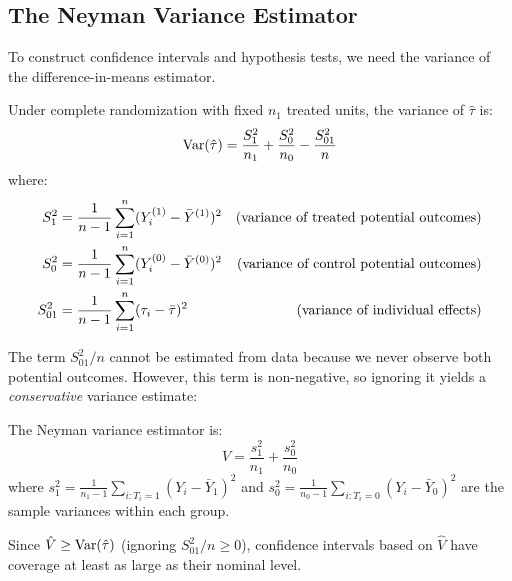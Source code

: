 \subsection{The Neyman Variance Estimator}

To construct confidence intervals and hypothesis tests, we need the variance of the difference-in-means estimator.

\begin{theorem}
\label{thm:neyman_var}
Under complete randomization with fixed $n_1$ treated units, the variance of $\hat{\tau}$ is:
\begin{equation}
\mathrm{Var}(\hat{\tau}) = \frac{S_1^2}{n_1} + \frac{S_0^2}{n_0} - \frac{S_{01}^2}{n}
\label{eq:neyman_var}
\end{equation}
where:
\begin{align}
S_1^2 &= \frac{1}{n-1} \sum_{i=1}^{n} (Y^{(1)}_i - \bar{Y}^{(1)})^2 & \text{(variance of treated potential outcomes)} \\
S_0^2 &= \frac{1}{n-1} \sum_{i=1}^{n} (Y^{(0)}_i - \bar{Y}^{(0)})^2 & \text{(variance of control potential outcomes)} \\
S_{01}^2 &= \frac{1}{n-1} \sum_{i=1}^{n} (\tau_i - \bar{\tau})^2 & \text{(variance of individual effects)}
\end{align}
\end{theorem}

The term $S_{01}^2/n$ cannot be estimated from data because we never observe both potential outcomes. However, this term is non-negative, so ignoring it yields a \emph{conservative} variance estimate:

\begin{definition}
\label{def:neyman_var_est}
The Neyman variance estimator is:
\begin{equation}
\hat{V} = \frac{s_1^2}{n_1} + \frac{s_0^2}{n_0}
\label{eq:neyman_var_est}
\end{equation}
where $s_1^2 = \frac{1}{n_1 - 1} \sum_{i: T_i = 1} (Y_i - \bar{Y}_1)^2$ and $s_0^2 = \frac{1}{n_0 - 1} \sum_{i: T_i = 0} (Y_i - \bar{Y}_0)^2$ are the sample variances within each group.
\end{definition}

\begin{proposition}
Since $\hat{V} \geq \mathrm{Var}(\hat{\tau})$ (ignoring $S_{01}^2/n \geq 0$), confidence intervals based on $\hat{V}$ have coverage at least as large as their nominal level.
\end{proposition}


